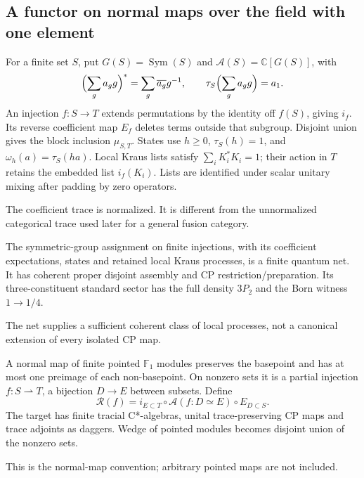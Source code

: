 \subsection{A functor on normal maps over the field with one element}

\begin{definition}
For a finite set $S$, put $G(S)=\operatorname{Sym}(S)$ and
$\mathcal A(S)=\mathbb C[G(S)]$, with
\[
\Bigl(\sum_ga_gg\Bigr)^*=\sum_g\overline{a_g}g^{-1},\qquad
\tau_S\Bigl(\sum_ga_gg\Bigr)=a_1.
\]
An injection $f:S\to T$ extends permutations by the identity off $f(S)$,
giving $i_f$. Its reverse coefficient map $E_f$ deletes terms outside
that subgroup. Disjoint union gives the block inclusion $\mu_{S,T}$.
States use $h\geq0$, $\tau_S(h)=1$, and $\omega_h(a)=\tau_S(ha)$.
Local Kraus lists satisfy $\sum_iK_i^*K_i=1$; their action in $T$ retains
the embedded list $i_f(K_i)$. Lists are identified under scalar unitary
mixing after padding by zero operators.
\end{definition}
\begin{scope}The coefficient trace is normalized. It is different from
the unnormalized categorical trace used later for a general fusion category.\end{scope}

\begin{theorem}
{\normalfont\statusProved}\quad The symmetric-group assignment on finite
injections, with its coefficient expectations, states and retained local
Kraus processes, is a finite quantum net. It has coherent proper
disjoint assembly and CP restriction/preparation. Its three-constituent
standard sector has the full density $3P_2$ and the Born witness $1\to1/4$.
\end{theorem}
\begin{scope}The net supplies a sufficient coherent class of local
processes, not a canonical extension of every isolated CP map.\end{scope}

\begin{definition}
A normal map of finite pointed $\mathbb F_1$ modules preserves the
basepoint and has at most one preimage of each non-basepoint. On nonzero
sets it is a partial injection $f:S\rightharpoonup T$, a bijection
$D\to E$ between subsets. Define
\[
\mathcal R(f)=i_{E\subset T}\circ\mathcal A(f:D\simeq E)\circ E_{D\subset S}.
\]
The target has finite tracial C*-algebras, unital trace-preserving CP
maps and trace adjoints as daggers. Wedge of pointed modules becomes
disjoint union of the nonzero sets.
\end{definition}
\begin{scope}This is the normal-map convention; arbitrary pointed maps
are not included.\end{scope}

